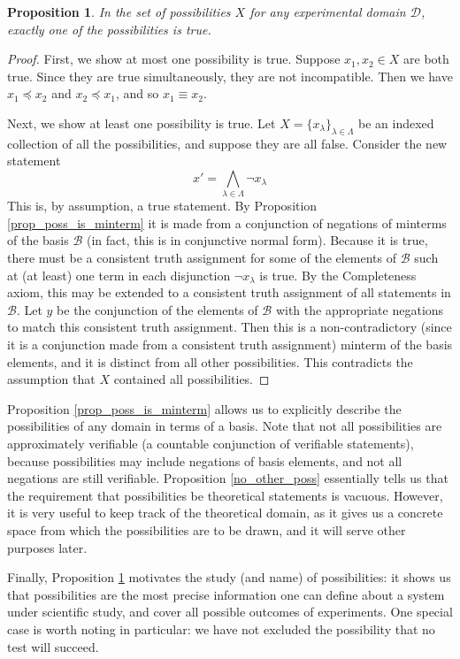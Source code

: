 \documentclass[psamsfonts]{amsart}
\newtheorem{prop}[thm]{Proposition}
\theoremstyle{definition}
\theoremstyle{remark}
\numberwithin{equation}{section}
\def\narrower{\preccurlyeq}
\def\bigAND{\bigwedge}
\def\NOT{\neg}
\newcommand{\edomain}[1][D] {\mathcal{#1}}
\newcommand{\basis}[1][B] {\mathcal{#1}} %
\begin{document}
\begin{prop}\label{exactly_one_poss}
In the set of possibilities $X$ for any experimental domain $\edomain$, exactly one of the possibilities is true. 
\end{prop}
\begin{proof}
First, we show at most one possibility is true. Suppose $x_1,x_2\in X$ are both true. Since they are true simultaneously, they are not incompatible. Then we have $x_1\narrower x_2$ and $x_2\narrower x_1$, and so $x_1\equiv x_2$. 

Next, we show at least one possibility is true. Let $X=\{x_{\lambda}\}_{\lambda\in\Lambda}$ be an indexed collection of all the possibilities, and suppose they are all false. Consider the new statement
$$
x' = \bigAND_{\lambda\in\Lambda}\NOT x_{\lambda}
$$
This is, by assumption, a true statement. By Proposition \ref{prop_poss_is_minterm} it is made from a conjunction of negations of minterms of the basis $\basis$ (in fact, this is in conjunctive normal form). Because it is true, there must be a consistent truth assignment for some of the elements of $\basis$ such at (at least) one term in each disjunction $\NOT x_{\lambda}$ is true. By the Completeness axiom, this may be extended to a consistent truth assignment of all statements in $\basis$. Let $y$ be the conjunction of the elements of $\basis$ with the appropriate negations to match this consistent truth assignment. Then this is a non-contradictory (since it is a conjunction made from a consistent truth assignment) minterm of the basis elements, and it is distinct from all other possibilities. This contradicts the assumption that $X$ contained all possibilities.
\end{proof}


Proposition \ref{prop_poss_is_minterm} allows us to explicitly describe the possibilities of any domain in terms of a basis. Note that not all possibilities are approximately verifiable (a countable conjunction of verifiable statements), because possibilities may include negations of basis elements, and not all negations are still verifiable. Proposition \ref{no_other_poss} essentially tells us that the requirement that possibilities be theoretical statements is vacuous. However, it is very useful to keep track of the theoretical domain, as it gives us a concrete space from which the possibilities are to be drawn, and it will serve other purposes later. 

Finally, Proposition \ref{exactly_one_poss} motivates the study (and name) of possibilities: it shows us that possibilities are the most precise information one can define about a system under scientific study, and cover all possible outcomes of experiments. One special case is worth noting in particular: we have not excluded the possibility that no test will succeed.
\end{document}
